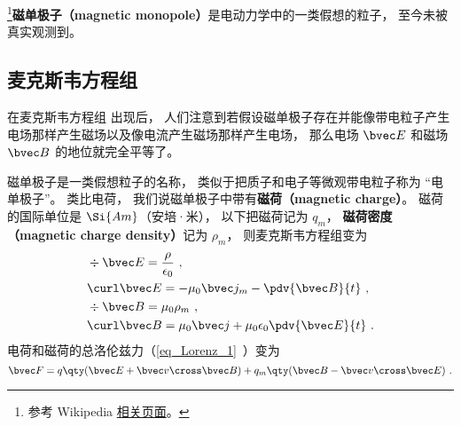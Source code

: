 

\begin{issues}
\issueDraft
\end{issues}

\footnote{参考 Wikipedia \href{https://en.wikipedia.org/wiki/Magnetic_monopole}{相关页面}。}\textbf{磁单极子（magnetic monopole）}是电动力学中的一类假想的粒子， 至今未被真实观测到。

\subsection{麦克斯韦方程组}

 在麦克斯韦方程组 出现后， 人们注意到若假设磁单极子存在并能像带电粒子产生电场那样产生磁场以及像电流产生磁场那样产生电场， 那么电场 $\bvec E$ 和磁场 $\bvec B$ 的地位就完全平等了。

磁单极子是一类假想粒子的名称， 类似于把质子和电子等微观带电粒子称为 “电单极子”。 类比电荷， 我们说磁单极子中带有\textbf{磁荷（magnetic charge）}。 磁荷的国际单位是 $\Si{Am}$（安培·米）， 以下把磁荷记为 $q_m$， \textbf{磁荷密度（magnetic charge density）}记为 $\rho_m$， 则麦克斯韦方程组变为
\begin{equation}
\begin{aligned}
&\div \bvec E = \frac{\rho}{\epsilon_0}~,\\
&\curl \bvec E = - \mu_0 \bvec j_m -\pdv{\bvec B}{t}~,\\
&\div \bvec B = \mu_0 \rho_m~,\\
&\curl \bvec B = \mu_0 \bvec j + \mu_0\epsilon_0 \pdv{\bvec E}{t}~.
\end{aligned}
\end{equation}
电荷和磁荷的总洛伦兹力（\autoref{eq_Lorenz_1}~）变为
\begin{equation}
\bvec F = q \qty(\bvec E + \bvec v \cross \bvec B) +
q_m \qty(\bvec B - \bvec v \cross \bvec E)~.
\end{equation}


